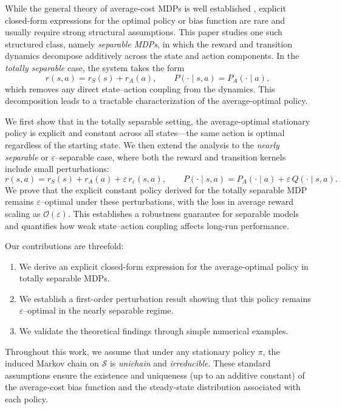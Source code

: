 \documentclass{article}
\begin{document}
While the general theory of average-cost MDPs is well established \cite{Puterman1994,Bertsekas2012}, explicit closed-form expressions for the optimal policy or bias function are rare and usually require strong structural assumptions. This paper studies one such structured class, namely \emph{separable MDPs}, in which the reward and transition dynamics decompose additively across the state and action components. In the \emph{totally separable} case, the system takes the form
\begin{equation}
    r(s,a) = r_S(s) + r_A(a), \qquad 
    P(\cdot \mid s,a) = P_A(\cdot \mid a),
\end{equation}
which removes any direct state–action coupling from the dynamics. This decomposition leads to a tractable characterization of the average-optimal policy.

We first show that in the totally separable setting, the average-optimal stationary policy is explicit and constant across all states—the same action is optimal regardless of the starting state. We then extend the analysis to the \emph{nearly separable} or $\varepsilon$–separable case, where both the reward and transition kernels include small perturbations:
\begin{equation}
    r(s,a) = r_S(s) + r_A(a) + \varepsilon\,r_\varepsilon(s,a), \qquad 
    P(\cdot \mid s,a) = P_A(\cdot \mid a) + \varepsilon\,Q(\cdot \mid s,a).
\end{equation}
We prove that the explicit constant policy derived for the totally separable MDP remains $\varepsilon$–optimal under these perturbations, with the loss in average reward scaling as $\mathcal{O}(\varepsilon)$. This establishes a robustness guarantee for separable models and quantifies how weak state–action coupling affects long-run performance.

Our contributions are threefold:
\begin{enumerate}
    \item We derive an explicit closed-form expression for the average-optimal policy in totally separable MDPs.
    \item We establish a first-order perturbation result showing that this policy remains $\varepsilon$–optimal in the nearly separable regime.
    \item We validate the theoretical findings through simple numerical examples.
\end{enumerate}

Throughout this work, we assume that under any stationary policy $\pi$, the induced Markov chain on $\mathcal{S}$ is \emph{unichain} and \emph{irreducible}. These standard assumptions ensure the existence and uniqueness (up to an additive constant) of the average-cost bias function and the steady-state distribution associated with each policy.
\end{document}
